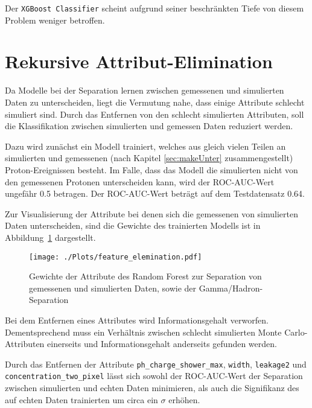 Der \texttt{XGBoost Classifier} scheint aufgrund seiner beschränkten Tiefe von diesem Problem weniger betroffen. 

\section{Rekursive Attribut-Elimination }
Da Modelle bei der Separation lernen zwischen gemessenen und simulierten Daten zu unterscheiden, liegt die Vermutung nahe, dass einige Attribute schlecht simuliert sind.
Durch das Entfernen von den schlecht simulierten Attributen, soll die Klassifikation zwischen simulierten und gemessen Daten reduziert werden.

Dazu wird zunächst ein Modell trainiert, welches aus gleich vielen Teilen an simulierten und gemessenen (nach Kapitel \ref{sec:makeUnter} zusammengestellt) Proton-Ereignissen besteht. 
Im Falle, dass das Modell die simulierten nicht von den gemessenen Protonen unterscheiden kann, wird der ROC-AUC-Wert ungefähr \num{0.5} betragen. 
Der ROC-AUC-Wert beträgt auf dem Testdatensatz \num{0.64}. 

Zur Visualisierung der Attribute bei denen sich die gemessenen von simulierten Daten unterscheiden, sind die Gewichte des trainierten Modells ist in Abbildung~\ref{fig:featureimportance} dargestellt. 
\begin{figure}[H]
  \centering
  \texttt{[image: ./Plots/feature\_elemination.pdf]}
  \caption{Gewichte der Attribute des Random Forest zur Separation von gemessenen und simulierten Daten, sowie der Gamma/Hadron-Separation }
  \label{fig:featureimportance}
\end{figure}
Bei dem Entfernen eines Attributes wird Informationsgehalt verworfen. 
Dementsprechend muss ein Verhältnis zwischen schlecht simulierten Monte Carlo-Attributen einerseits und Informationsgehalt anderseits gefunden werden.

Durch das Entfernen der Attribute \texttt{ph\_charge\_shower\_max}, \texttt{width}, \texttt{leakage2} und \texttt{concentration\_two\_pixel} lässt sich sowohl der ROC-AUC-Wert der Separation zwischen simulierten und echten Daten minimieren, als auch die Signifikanz des auf echten Daten trainierten  um circa ein $\sigma$ erhöhen.
